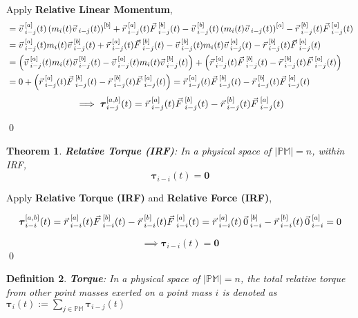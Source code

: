 \documentclass[12pt]{amsart}
\newtheorem{theorem}{Theorem}[section]
\newtheorem{definition}[theorem]{Definition}
\renewenvironment{proof}{{\bfseries Proof.}}{\qed}
\let\oldvec\vec
\renewcommand{\vec}[1]{\oldvec{#1}\hspace{0.1em}}
\begin{document}
\begin{proof}
Apply \textbf{Relative Linear Momentum},
\begin{align*}
 &= \vec{v}_{i-j} ^{[a]} (t) \left ( m_i (t)\vec{v}_{i-j} (t) \right )^{[b]} + \vec{r}^{[a]}_{i-j} (t) \vec{F}_{i-j}^{[b]} (t) - \vec{v}_{i-j} ^{[b]} (t) \left ( m_i (t)\vec{v}_{i-j} (t) \right )^{[a]} - \vec{r}^{[b]}_{i-j} (t) \vec{F}_{i-j}^{[a]} (t) \\
 &= \vec{v}_{i-j} ^{[a]} (t)  m_i (t) \vec{v}_{i-j} ^{[b]} (t) + \vec{r}^{[a]}_{i-j} (t) \vec{F}_{i-j}^{[b]} (t) - \vec{v}_{i-j} ^{[b]} (t)  m_i (t)\vec{v}_{i-j} ^{[a]} (t) - \vec{r}^{[b]}_{i-j} (t) \vec{F}_{i-j}^{[a]} (t) \\
 &= \left ( \vec{v}_{i-j} ^{[a]} (t)  m_i (t) \vec{v}_{i-j} ^{[b]} (t) - \vec{v}_{i-j} ^{[a]} (t)  m_i (t)\vec{v}_{i-j} ^{[b]} (t) \right ) + \left ( \vec{r}^{[a]}_{i-j} (t) \vec{F}_{i-j}^{[b]} (t) - \vec{r}^{[b]}_{i-j} (t) \vec{F}_{i-j}^{[a]} (t) \right )\\
 &= 0 + \left ( \vec{r}^{[a]}_{i-j} (t) \vec{F}^{[b]}_{i-j} (t) - \vec{r}^{[b]}_{i-j} (t) \vec{F}^{[a]}_{i-j} (t) \right )= \vec{r}^{[a]}_{i-j} (t) \vec{F}^{[b]}_{i-j} (t) - \vec{r}^{[b]}_{i-j} (t) \vec{F}^{[a]}_{i-j} (t)
 \end{align*}
$$\implies \boldsymbol{ \tau}_{i-j}^{[a,b]} (t) = \vec{r}^{[a]}_{i-j} (t) \vec{F}^{[b]}_{i-j} (t) - \vec{r}^{[b]}_{i-j} (t) \vec{F}^{[a]}_{i-j} (t)$$

\end{proof}

\begin{theorem}
    \textbf{Relative Torque (IRF)}: In a physical space of $\left | \mathbb{PM} \right | = n$, within IRF, $$ \boldsymbol{\tau}_{i-i} (t) = \boldsymbol{0} $$
\end{theorem}

\begin{proof}
Apply \textbf{Relative Torque (IRF)} and \textbf{Relative Force (IRF)},

$$ \boldsymbol{\tau}_{i-i} ^{[a,b]} (t) = \vec{r}^{[a]}_{i-i} (t)\vec{F}^{[b]}_{i-i} (t) - \vec{r}^{[b]}_{i-i} (t) \vec{F}^{[a]}_{i-i} (t) = \vec{r}^{[a]}_{i-i} (t)\, \vec{0}^{[b]}_{i-i} - \vec{r}^{[b]}_{i-i} (t) \, \vec{0}^{[a]}_{i-i}= 0 $$

$$ \implies \boldsymbol{\tau}_{i-i} (t) = \boldsymbol{0} $$
\end{proof}

\begin{definition}
\textbf{Torque}: In a physical space of $\left | \mathbb{PM} \right | = n$, the total relative torque from other point masses exerted on a point mass $i$ is denoted as $ \boldsymbol{\tau}_{i}(t) := \displaystyle \sum_{j \in \mathbb{PM}} \boldsymbol{\tau}_{i-j} (t) $
\end{definition}
\end{document}
